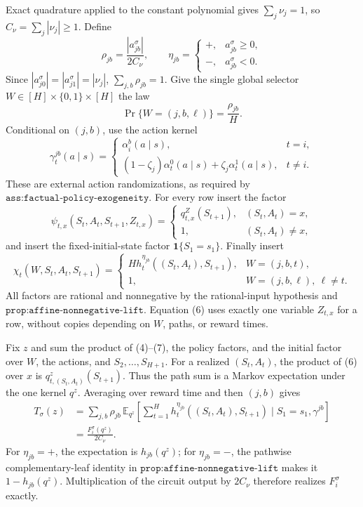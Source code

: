 Exact quadrature applied to the constant polynomial gives \(\sum_j\nu_j=1\), so \(C_\nu=\sum_j|\nu_j|\ge1\).  Define
\[
 \rho_{jb}=\frac{|a_{jb}^\sigma|}{2C_\nu},
 \qquad
 \eta_{jb}=\begin{cases}+,&a_{jb}^\sigma\ge0,\\-,&a_{jb}^\sigma<0.
 \end{cases} \tag{3}
\]
Since \(|a_{j0}^\sigma|=|a_{j1}^\sigma|=|\nu_j|\), \(\sum_{j,b}\rho_{jb}=1\).  Give the single global selector \(W\in[H]\times\{0,1\}\times[H]\) the law
\[
 \Pr\{W=(j,b,\ell)\}=\frac{\rho_{jb}}H. \tag{4}
\]
Conditional on \((j,b)\), use the action kernel
\[
 \gamma_t^{jb}(a\mid s)=
 \begin{cases}
 \alpha_i^b(a\mid s),&t=i,\\
 (1-\zeta_j)\alpha_t^0(a\mid s)+\zeta_j\alpha_t^1(a\mid s),&t\ne i.
 \end{cases} \tag{5}
\]
These are external action randomizations, as required by \(\texttt{ass:factual-policy-exogeneity}\).  For every row insert the factor
\[
 \psi_{t,x}(S_t,A_t,S_{t+1},Z_{t,x})=
 \begin{cases}
 q^Z_{t,x}(S_{t+1}),&(S_t,A_t)=x,\\
 1,&(S_t,A_t)\ne x,
 \end{cases} \tag{6}
\]
and insert the fixed-initial-state factor \(\mathbf1\{S_1=s_1\}\).  Finally insert
\[
 \chi_t(W,S_t,A_t,S_{t+1})=
 \begin{cases}
 Hh_t^{\eta_{jb}}((S_t,A_t),S_{t+1}),&W=(j,b,t),\\
 1,&W=(j,b,\ell),\ \ell\ne t.
 \end{cases} \tag{7}
\]
All factors are rational and nonnegative by the rational-input hypothesis and \(\texttt{prop:affine-nonnegative-lift}\).  Equation (6) uses exactly one variable \(Z_{t,x}\) for a row, without copies depending on \(W\), paths, or reward times.

Fix \(z\) and sum the product of (4)--(7), the policy factors, and the initial factor over \(W\), the actions, and \(S_2,\ldots,S_{H+1}\).  For a realized \((S_t,A_t)\), the product of (6) over \(x\) is \(q^z_{t,(S_t,A_t)}(S_{t+1})\).  Thus the path sum is a Markov expectation under the one kernel \(q^z\).  Averaging over reward time and then \((j,b)\) gives
\[
 \begin{aligned}
 T_\sigma(z)
 &=\sum_{j,b}\rho_{jb}\,
 \mathbb E_{q^z}\left[
 \sum_{t=1}^Hh_t^{\eta_{jb}}((S_t,A_t),S_{t+1})
 \mid S_1=s_1,\gamma^{jb}\right]\\
 &=\frac{F_i^\sigma(q^z)}{2C_\nu}.
 \end{aligned} \tag{8}
\]
For \(\eta_{jb}=+\), the expectation is \(h_{jb}(q^z)\); for \(\eta_{jb}=-\), the pathwise complementary-leaf identity in \(\texttt{prop:affine-nonnegative-lift}\) makes it \(1-h_{jb}(q^z)\).  Multiplication of the circuit output by \(2C_\nu\) therefore realizes \(F_i^\sigma\) exactly.

